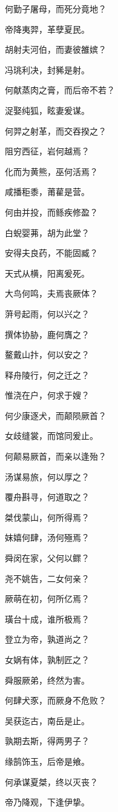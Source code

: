 \documentclass[12pt,a4paper]{ctexbook}
\begin{document}
何勤子屠母，而死分竟地？\par
帝降夷羿，革孽夏民。\par
胡射夫河伯，而妻彼雒嫔？\par
冯珧利决，封豨是射。\par
何献蒸肉之膏，而后帝不若？\par
浞娶纯狐，眩妻爰谋。\par
何羿之射革，而交吞揆之？\par
阻穷西征，岩何越焉？\par
化而为黄熊，巫何活焉？\par
咸播秬黍，莆雚是营。\par
何由并投，而鲧疾修盈？\par
白蜺婴茀，胡为此堂？\par
安得夫良药，不能固臧？\par
天式从横，阳离爰死。\par
大鸟何鸣，夫焉丧厥体？\par
蓱号起雨，何以兴之？\par
撰体协胁，鹿何膺之？\par
鳌戴山抃，何以安之？\par
释舟陵行，何之迁之？\par
惟浇在户，何求于嫂？\par
何少康逐犬，而颠陨厥首？\par
女歧缝裳，而馆同爰止。\par
何颠易厥首，而亲以逢殆？\par
汤谋易旅，何以厚之？\par
覆舟斟寻，何道取之？\par
桀伐蒙山，何所得焉？\par
妺嬉何肆，汤何殛焉？\par
舜闵在家，父何以鳏？\par
尧不姚告，二女何亲？\par
厥萌在初，何所亿焉？\par
璜台十成，谁所极焉？\par
登立为帝，孰道尚之？\par
女娲有体，孰制匠之？\par
舜服厥弟，终然为害。\par
何肆犬豕，而厥身不危败？\par
吴获迄古，南岳是止。\par
孰期去斯，得两男子？\par
缘鹄饰玉，后帝是飨。\par
何承谋夏桀，终以灭丧？\par
帝乃降观，下逢伊挚。\par
\end{document}
